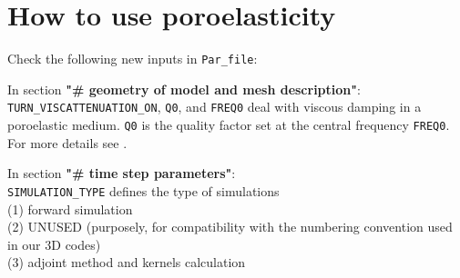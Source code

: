 \documentclass[oneside,english,onecolumn,letterpaper]{book}
\begin{document}
\section{How to use poroelasticity}

Check the following new inputs in \texttt{Par\_file}:
\begin{description}
\item In section {\bf "\# geometry of model and mesh description"}:\\
\texttt{TURN\_VISCATTENUATION\_ON}, \texttt{Q0}, and \texttt{FREQ0} deal with viscous damping in a poroelastic medium.
\texttt{Q0} is the quality factor set at the central frequency \texttt{FREQ0}. For more details
see \cite{MoTr08}.

\item In section {\bf "\# time step parameters"}:\\
\texttt{SIMULATION\_TYPE} defines the type of simulations \\
(1) forward simulation \\
(2) UNUSED (purposely, for compatibility with the numbering convention used in our 3D codes) \\
(3) adjoint method and kernels calculation


\end{description}
\end{document}
